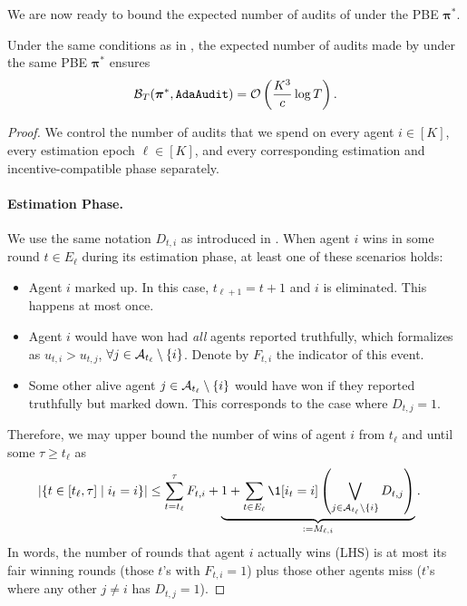 We are now ready to bound the expected number of audits of \mechname under the PBE $\bm\pi^\ast$.

\begin{theorem}\label{thm:audit main theorem formal}
Under the same conditions as in , the expected number of audits made by \mechname under the same PBE $\bm \pi^\ast$ ensures
\begin{equation*}
\mathcal B_T(\bm \pi^\ast,\texttt{AdaAudit})=\operatorname{\mathcal O}\left( \frac{K^3}{c} \log T \right).
\end{equation*}
\end{theorem}
\begin{proof}
We control the number of audits that we spend on every agent $i\in [K]$, every estimation epoch $\ell\in [K]$, and every corresponding estimation and incentive-compatible phase separately.

\paragraph{Estimation Phase.}
We use the same notation $D_{t,i}$ as introduced in . When agent $i$ wins in some round $t\in E_\ell$ during its estimation phase, at least one of these scenarios holds:
\begin{itemize}
\item Agent $i$ marked up. In this case, $t_{\ell+1}=t+1$ and $i$ is eliminated. This happens at most once.
\item Agent $i$ would have won had \emph{all} agents reported truthfully, which formalizes as $u_{t,i}>u_{t,j}$, $\forall j\in \mathcal{A}_{t_\ell}\setminus \{i\}$. Denote by $F_{t,i}$ the indicator of this event.
\item Some other alive agent $j\in \mathcal{A}_{t_\ell}\setminus \{i\}$ would have won if they reported truthfully but marked down. This corresponds to the case where $D_{t,j}=1$.
\end{itemize}
Therefore, we may upper bound the number of wins of agent $i$ from $t_\ell$ and until some $\tau\ge t_\ell$ as
\begin{align}
    \abs{\set{ t\in[t_\ell,\tau]\mid i_{t}=i }}
    &\leq \sum_{t=t_\ell}^{\tau} F_{t,i} + \underbrace{1+\sum_{t\in E_\ell} \1[i_{t}=i] \left (\bigvee_{j\in\mA_{t_\ell}\setminus\{i\}} D_{t,j} \right )}_{:=M_{\ell,i}}.\label{eq:upper_bound_nb_wins}
\end{align}
In words, the number of rounds that agent $i$ actually wins (LHS) is at most its fair winning rounds (those $t$'s with $F_{t,i}=1$) plus those other agents miss ($t$'s where any other $j\ne i$ has $D_{t,j}=1$).


\end{proof}
